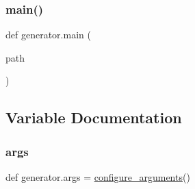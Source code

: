 \subsubsection{\texorpdfstring{main()}{main()}}
{\footnotesize\ttfamily def generator.\+main (\begin{DoxyParamCaption}\item[{}]{path }\end{DoxyParamCaption})}



\subsection{Variable Documentation}
\mbox{\label{namespacegenerator_a3bbee52e6a87a6496700890e3344c874}} 
\subsubsection{\texorpdfstring{args}{args}}
{\footnotesize\ttfamily def generator.\+args = \hyperlink{namespacegenerator_a300e19c576b1e53645eb8811f9cc3f22}{configure\+\_\+arguments}()}

